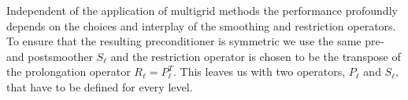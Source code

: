 

Independent of the application of multigrid methods the performance
profoundly depends on the choices and interplay of the smoothing and
restriction operators. To ensure that the resulting preconditioner is
symmetric we use the same pre- and postsmoother $S_\ell$ and the
restriction operator is chosen to be the transpose of the prolongation
operator $R_\ell = P_\ell^T$. This leaves us with two operators,
$P_\ell$ and $S_\ell$, that have to be defined for every level.


